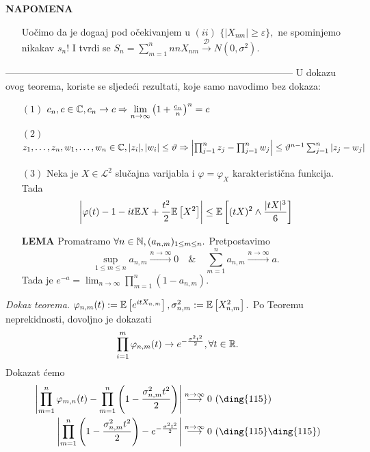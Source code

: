 \documentclass{article}
\begin{document}
\textbf{NAPOMENA}
\begin{enumerate}
    \item[\ding{113}] Uočimo da je doga\dj{}aj pod očekivanjem u \((ii)\) \(\{|X_{nm}|\ge\varepsilon\},\) ne spominjemo nikakav \(s_n\)! I tvrdi se \(S_n=\sum_{m=1}^nnnX_{nm}\overset{\mathcal D}{\longrightarrow}N(0,\sigma^2).\)
\end{enumerate}------------------------------------------------------------------------------------------\newline\newline
U dokazu ovog teorema, koriste se sljedeći rezultati, koje samo navodimo bez dokaza:\newline\newline
\begin{enumerate}
    \item[\((1)\)] \(c_n,c\in\Bbb C,c_n\to c\Rightarrow\lim\limits_{n\to\infty}\left(1+\frac{c_n}n\right)^n=c\) 
    \item[\((2)\)] \(z_1,\ldots,z_n,w_1,\ldots,w_n\in\Bbb C,|z_i|,|w_i|\le\vartheta\Rightarrow\left|\prod_{j=1}^nz_j-\prod_{j=1}^nw_j\right|\le\vartheta^{n-1}\sum_{j=1}^n|z_j-w_j|\)
    \item[\((3)\)] Neka je \(X\in\mathcal L^2\) slučajna varijabla i \(\varphi=\varphi_X\) karakteristična funkcija. Tada \[\left|\varphi(t)-1-it\Bbb EX+\frac{t^2}2\Bbb E\left[X^2\right]\right|\le\Bbb E\left[(tX)^2\land\frac{|tX|^3}6\right]\]
    \item[\textbf{LEMA}] Promatramo \(\forall n\in\Bbb N,(a_{n,m})_{1\le m\le n}.\) Pretpostavimo \[\sup_{1\le m\le n}a_{n,m}\overset{n\to\infty}{\longrightarrow}0\quad\&\quad\sum_{m=1}^na_{n,m}\overset{n\to\infty}{\longrightarrow}a.\] Tada je \(\displaystyle e^{-a}=\lim_{n\to\infty}\prod_{m=1}^n(1-a_{n,m}).\)
\end{enumerate}
\textit{Dokaz teorema.}\newline
\(\varphi_{n,m}(t):=\Bbb E\left[e^{itX_{n,m}}\right],\sigma_{n,m}^2:=\Bbb E\left[X_{n,m}^2\right].\) Po Teoremu neprekidnosti, dovoljno je dokazati \[\prod_{i=1}^m\varphi_{n,m}(t)\to e^{-\frac{\sigma^2t^2}2},\forall t\in\Bbb R.\]
Dokazat ćemo \[\begin{aligned}\left|\prod_{m=1}^n\varphi_{m,n}(t)-\prod_{m=1}^n\left(1-\frac{\sigma_{n,m}^2t^2}2\right)\right|&\overset{n\to\infty}{\longrightarrow}0\text{ (\ding{115})}\\\left|\prod_{m=1}^n\left(1-\frac{\sigma_{n,m}^2t^2}2\right)-e^{-\frac{\sigma^2t^2}2}\right|&\overset{n\to\infty}{\longrightarrow}0\text{ (\ding{115}\ding{115})}\end{aligned}\]
\end{document}
